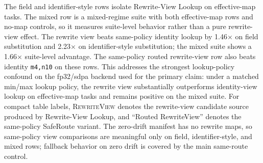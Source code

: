 \documentclass[11pt,a4paper]{article}
\begin{document}
The field and identifier-style rows isolate Rewrite-View Lookup on
effective-map tasks. The mixed row is a mixed-regime suite with both
effective-map rows and no-map controls, so it measures suite-level behavior
rather than a pure rewrite-view effect. The rewrite view beats same-policy
identity lookup by 1.46$\times$ on field substitution and 2.23$\times$ on
identifier-style substitution; the mixed suite shows a 1.66$\times$ suite-level
advantage. The same-policy routed rewrite-view row also beats identity
\texttt{m4,n10} on these rows. This addresses the strongest lookup-policy confound on the
fp32/sdpa backend used for the primary claim: under a matched min/max lookup
policy, the rewrite view substantially outperforms identity-view lookup on
effective-map tasks and remains positive on the mixed suite.
For compact table labels, \textsc{RewriteView} denotes the rewrite-view
candidate source produced by Rewrite-View Lookup, and ``Routed RewriteView''
denotes the same-policy SafeRoute variant.
The zero-drift manifest has no rewrite maps, so same-policy view comparisons
are meaningful only on field, identifier-style, and mixed rows; fallback
behavior on zero drift is covered by the main same-route control.

\begin{table}[h]
\centering\scriptsize
\caption{Same-backend same-policy lookup ablation on structured rows and the
mixed suite under the audited fp32/sdpa path.
Identity PLD and Rewrite-View Lookup use the same
\texttt{min\_match=4,max\_match=10} policy. Ratios are computed from displayed
denominators in the same artifact. CIs are paired task-bootstrap intervals from
5000 resamples with seed 123 and measure task heterogeneity, not run-to-run GPU
variance. The zero-drift fallback row is omitted because no rewrite map exists
there; field and identifier-style rows isolate Rewrite-View Lookup, while mixed
reports suite-level behavior.}
\label{tab:same-policy}
\end{table}
\end{document}
